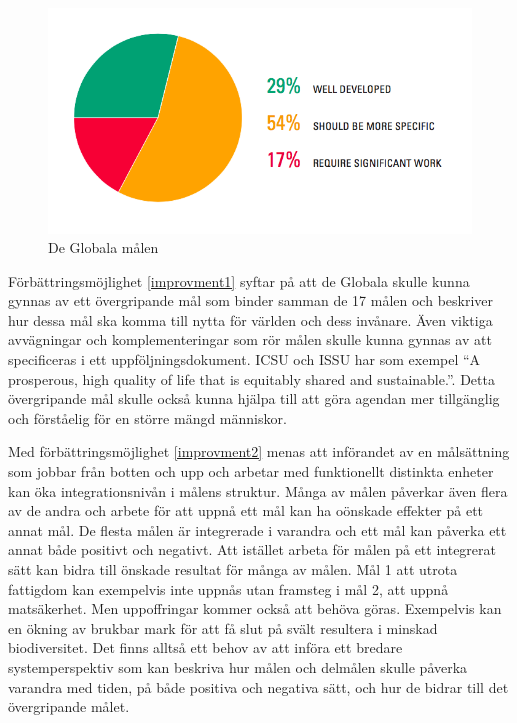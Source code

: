\documentclass{report}
\begin{document}
\begin{figure}[h] \label{fig1}
\label{improvments}
\includegraphics[width=\linewidth]{improvments.png}
\caption{De Globala målen \cite{review}} 
\end{figure}

Förbättringsmöjlighet \ref{improvment1} syftar på att de Globala skulle kunna gynnas av ett övergripande mål som binder samman de 17 målen och beskriver hur dessa mål ska komma till nytta för världen och dess invånare. Även viktiga avvägningar och komplementeringar som rör målen skulle kunna gynnas av att specificeras i ett uppföljningsdokument. ICSU och ISSU har som exempel “A prosperous, high quality of life that is equitably shared and sustainable.”. Detta övergripande mål skulle också kunna hjälpa till att göra agendan mer tillgänglig och förståelig för en större mängd människor.\cite{webC}

Med förbättringsmöjlighet \ref{improvment2} menas att införandet av en målsättning som jobbar från botten och upp och arbetar med funktionellt distinkta enheter kan öka integrationsnivån i målens struktur.\cite{Weitz}
Många av målen påverkar även flera av de andra och arbete för att uppnå ett mål kan ha oönskade effekter på ett annat mål. De flesta målen är integrerade i varandra och ett mål kan påverka ett annat både positivt och negativt. Att istället arbeta för målen på ett integrerat sätt kan bidra till önskade resultat för många av målen. Mål 1 att utrota fattigdom kan exempelvis inte uppnås utan framsteg i mål 2, att uppnå matsäkerhet. Men uppoffringar kommer också att behöva göras. Exempelvis kan en ökning av brukbar mark för att få slut på svält resultera i minskad biodiversitet. Det finns alltså ett behov av att införa ett bredare systemperspektiv som kan beskriva hur målen och delmålen skulle påverka varandra med tiden, på både positiva och negativa sätt, och hur de bidrar till det övergripande målet. \cite{review}\\
\end{document}
